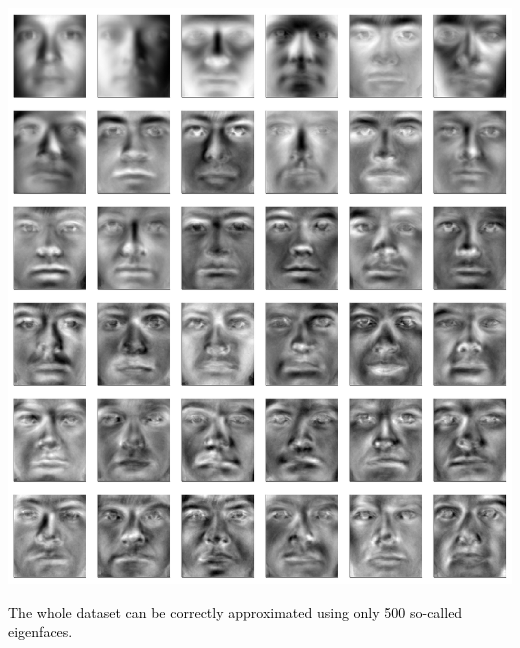 \documentclass[aspectratio=169, usenames, dvipsnames]{beamer}
\begin{document}
{

\begin{frame}
  \vfill

  \begin{minipage}{.58\textwidth}
    \centering
    \includegraphics[height=.95\textheight]{leading_eigenfaces}
  \end{minipage}%
  \hfill
  \begin{minipage}{.38\textwidth}
    \textcolor{black}{
    The whole dataset can be correctly approximated using only 500 so-called eigenfaces.
    }
  \end{minipage}
  \vfill
\end{frame}

}
\end{document}
